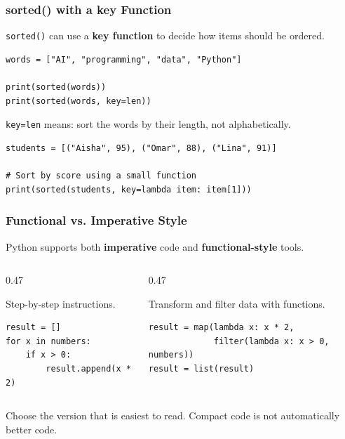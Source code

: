 \documentclass[aspectratio=169,10pt]{beamer}
\newcommand{\keyword}[1]{\textcolor{PrimaryBlue}{\textbf{#1}}}
\newcommand{\codeword}[1]{\texttt{#1}}
\begin{document}
\begin{frame}[fragile]
\frametitle{sorted() with a key Function}
\small
\codeword{sorted()} can use a \keyword{key function} to decide how items should be ordered.

\vspace{0.18cm}
\begin{lstlisting}[style=pycode]
words = ["AI", "programming", "data", "Python"]

print(sorted(words))
print(sorted(words, key=len))
\end{lstlisting}

\begin{tcolorbox}[lecturebox,title=Key idea]
\codeword{key=len} means: sort the words by their length, not alphabetically.
\end{tcolorbox}

\vspace{0.1cm}
\begin{lstlisting}[style=pycode]
students = [("Aisha", 95), ("Omar", 88), ("Lina", 91)]

# Sort by score using a small function
print(sorted(students, key=lambda item: item[1]))
\end{lstlisting}
\end{frame}

\begin{frame}[fragile]
\frametitle{Functional vs. Imperative Style}
\small
Python supports both \keyword{imperative} code and \keyword{functional-style} tools.

\vspace{0.18cm}
\begin{columns}[T,totalwidth=0.96\textwidth]
\begin{column}{0.47\textwidth}
\begin{tcolorbox}[lecturebox,title=Imperative style]
Step-by-step instructions.
\begin{lstlisting}[style=pycodesmall]
result = []
for x in numbers:
    if x > 0:
        result.append(x * 2)
\end{lstlisting}
\end{tcolorbox}
\end{column}
\begin{column}{0.47\textwidth}
\begin{tcolorbox}[lecturebox,title=Functional style]
Transform and filter data with functions.
\begin{lstlisting}[style=pycodesmall]
result = map(lambda x: x * 2,
             filter(lambda x: x > 0, numbers))
result = list(result)
\end{lstlisting}
\end{tcolorbox}
\end{column}
\end{columns}

\vspace{0.15cm}
\begin{tcolorbox}[lecturebox,title=Main principle]
Choose the version that is easiest to read. Compact code is not automatically better code.
\end{tcolorbox}
\end{frame}
\end{document}
